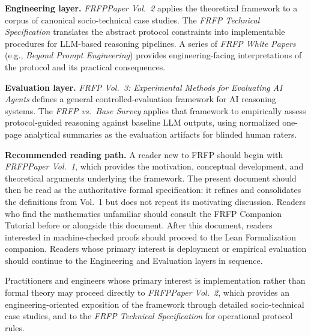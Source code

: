 \textbf{Engineering layer.} \textit{FRFPPaper Vol.~2} applies the theoretical framework to a
corpus of canonical socio-technical case studies. The \textit{FRFP Technical Specification}
translates the abstract protocol constraints into implementable procedures for LLM-based
reasoning pipelines. A series of \textit{FRFP White Papers} (e.g., \textit{Beyond Prompt
Engineering}) provides engineering-facing interpretations of the protocol and its practical
consequences.

\textbf{Evaluation layer.} \textit{FRFP Vol.~3: Experimental Methods for Evaluating AI Agents} defines a
general controlled-evaluation framework for AI reasoning systems. The \textit{FRFP vs.\ Base
Survey} applies that framework to empirically assess protocol-guided reasoning against baseline
LLM outputs, using normalized one-page analytical summaries as the evaluation artifacts for
blinded human raters.

\medskip
\noindent\textbf{Recommended reading path.} A reader new to FRFP should begin with
\textit{FRFPPaper Vol.~1}, which provides the motivation, conceptual development, and
theoretical arguments underlying the framework. The present document should then be read
as the authoritative formal specification: it refines and consolidates the definitions from
Vol.~1 but does not repeat its motivating discussion. Readers who find the mathematics
unfamiliar should consult the FRFP Companion Tutorial before or alongside this document.
After this document, readers interested in machine-checked proofs should proceed to the
Lean Formalization companion. Readers whose primary interest is deployment or empirical
evaluation should continue to the Engineering and Evaluation layers in sequence.

Practitioners and engineers whose primary interest is implementation rather than formal
theory may proceed directly to \textit{FRFPPaper Vol.~2}, which provides an
engineering-oriented exposition of the framework through detailed socio-technical case
studies, and to the \textit{FRFP Technical Specification} for operational protocol rules.

